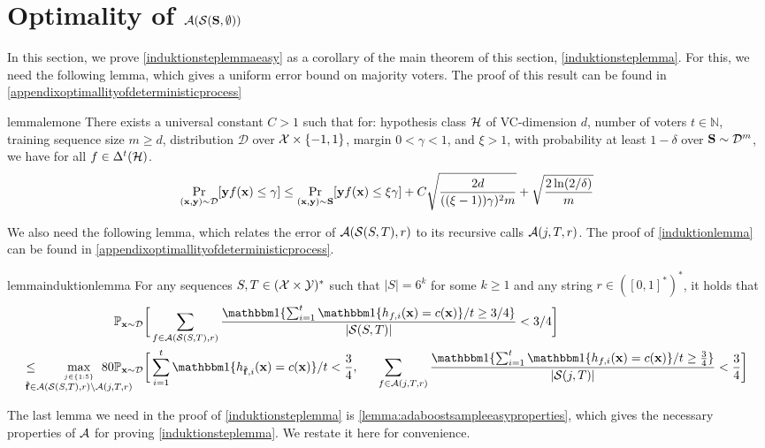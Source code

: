 \section{Optimality of $\mathcal{A}(\mathcal{S}(\mathbf{S},\emptyset))$}\label{sec:optimalitya}
In this section, we prove \cref{induktionsteplemmaeasy} as a corollary of the main theorem of this section, \cref{induktionsteplemma}. For this, we need the following lemma, which gives a uniform error bound on majority voters. The proof of this result can be found in \cref{appendixoptimallityofdeterministicprocess}

\begin{restatable}{lemma}{lemone}\label{lem1}
  There exists a universal constant $C>1$ such that for: hypothesis class $\mathcal{H}$ of VC-dimension $d$, number of voters $ t \in \mathbb{N} $, training sequence size $m\geq d$, distribution $\mathcal{D}$ over $\mathcal{X} \times \{-1,1\}$, margin $0< \gamma < 1$, and $\xi> 1$, with probability at least $1-\delta$ over $\mathbf{S}\sim \mathcal{D}^{m}$, we have for all $f \in \Delta^{t}(\mathcal{H})$.
  \begin{align*}
\Pr_{(\mathbf{x},\mathbf{y})\sim \mathcal{D}}[\mathbf{y} f(\mathbf{x}) \leq \gamma] \leq \Pr_{(\mathbf{x},\mathbf{y})\sim\mathbf{S}}[\mathbf{y} f(\mathbf{x}) \leq \xi \gamma] +  C\sqrt{\frac{2d}{((\xi-1))\gamma)^2 m}} + \sqrt{\frac{2 \ln(2/\delta)}{m}}
\end{align*}

\end{restatable}

We also need the following lemma, which relates the error of $ \mathcal{A}(\mathcal{S}(S,T),r) $ to its recursive calls $ \mathcal{A}(j,T,r) $. The proof of \cref{induktionlemma} can be found in \cref{appendixoptimallityofdeterministicprocess}.

\begin{restatable}{lemma}{induktionlemma}\label{induktionlemma}
  For any sequences $S,T\in (\mathcal{X}\times \mathcal{Y})^{*}$ such that $|S|= 6^{k}$ for some $k\geq 1$ and any string $r\in ([0,1]^{*})^{*}$, it holds that 
  \begin{align*}
    &\p_{\rx\sim \cD} \bigg[  
      \sum_{f\in \cA(\cS(S,T),r)} \frac{\ind\{\sum_{i=1}^{t} \ind\{h_{f,i}(\rx)=c(\rx)\}/t\geq 3/4\}}{|\cS(S,T)|}
       <3/4\bigg]
    \\
    \leq \negmedspace \negmedspace  \negmedspace   \negmedspace \negmedspace \max_{\stackrel{j\in\{ 1:5 \}}{\rf\in \cA(\cS(S,T),r) \backslash \cA(j,T,r)}} \negmedspace \negmedspace  \negmedspace \negmedspace \negmedspace \negmedspace \negmedspace  \negmedspace \negmedspace \negmedspace\negmedspace\negmedspace 80&\p_{\rx\sim \cD}
    \bigg[ \sum_{i=1}^{t}  \ind\{h_{\rf,i}(\rx)=c(\rx)\}/t < \frac{3}{4},
             \sum_{\text{\quad\quad}f\in \cA(j,T,r)}           \frac{\ind\{\sum_{i=1}^{t}  \ind\{h_{f,i}(\rx)=c(\rx)\}/t\geq \frac{3}{4}\}}{|\cS(j,T)|}
  <\frac{3}{4}\bigg]
  \end{align*}


\end{restatable}
The last lemma we need in the proof of \cref{induktionsteplemma} is \cref{lemma:adaboostsampleeasyproperties}, which gives the necessary properties of $ \mathcal{A} $  for proving \cref{induktionsteplemma}. We restate it here for convenience.

